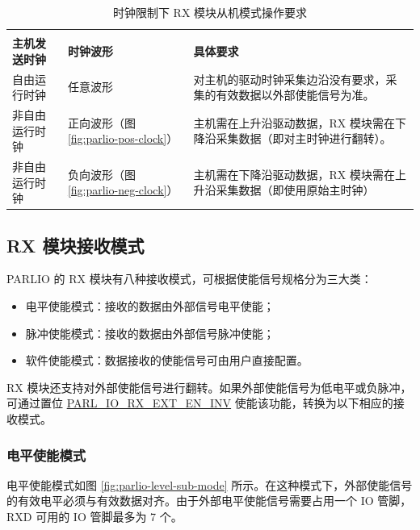 \documentclass[main\_\_CN.tex]{subfiles}
\begin{document}
\begin{table}[H]
    \centering
    \caption{时钟限制下 RX 模块从机模式操作要求}
    \label{tab:parlio-rx-slave-restriction}
    
    \begin{tabular}{|l|l|p{10cm}|}
    \hline
        \rowcolor{lightgray}
        \multicolumn{2}{|c|}{\textbf{时钟条件}} & \\
        \rowcolor{lightgray}
        \textbf{主机发送时钟} &\textbf{时钟波形} & \multirow{-2}{*}{\textbf{具体要求}} \\ \hline
        
        自由运行时钟    & 任意波形  & 对主机的驱动时钟采集边沿没有要求，采集的有效数据以外部使能信号为准。 \\ \hline
        非自由运行时钟  & 正向波形（图 \ref{fig:parlio-pos-clock}） & 主机需在上升沿驱动数据，RX 模块需在下降沿采集数据（即对主时钟进行翻转）。    \\ \hline
        非自由运行时钟  & 负向波形（图 \ref{fig:parlio-neg-clock}）  & 主机需在下降沿驱动数据，RX 模块需在上升沿采集数据（即使用原始主时钟）   \\ \hline
    \end{tabular}
\end{table}

\subsection{RX 模块接收模式}

PARLIO 的 RX 模块有八种接收模式，可根据使能信号规格分为三大类：

\begin{itemize}
    \item 电平使能模式：接收的数据由外部信号电平使能；
    \item 脉冲使能模式：接收的数据由外部信号脉冲使能；
    \item 软件使能模式：数据接收的使能信号可由用户直接配置。
\end{itemize}

RX 模块还支持对外部使能信号进行翻转。如果外部使能信号为低电平或负脉冲，可通过置位 \hyperref[fielddesc:PARLIORXEXTENINV]{PARL\_IO\_RX\_EXT\_EN\_INV} 使能该功能，转换为以下相应的接收模式。

\subsubsection{电平使能模式}

电平使能模式如图 \ref{fig:parlio-level-sub-mode} 所示。在这种模式下，外部使能信号的有效电平必须与有效数据对齐。由于外部电平使能信号需要占用一个 IO 管脚，RXD 可用的 IO 管脚最多为 7 个。
\end{document}
